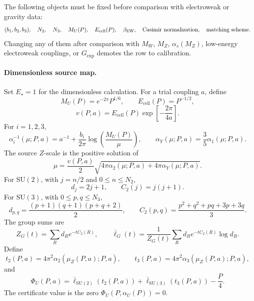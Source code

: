 \begin{definition}
The following objects must be fixed before comparison with electroweak or gravity data:
\[
(b_1,b_2,b_3),\quad
N_2,\quad
N_3,\quad
M_U(P),\quad
E_{\mathrm{cell}}(P),\quad
\beta_{\mathrm{EW}},\quad
\hbox{Casimir normalization},\quad
\hbox{matching scheme}.
\]
Changing any of them after comparison with \(M_W\), \(M_Z\), \(\alpha_s(M_Z)\), low-energy
electroweak couplings, or \(G_{\mathrm{exp}}\) demotes the row to calibration.
\end{definition}

\paragraph{Dimensionless source map.}
Set \(E_\star=1\) for the dimensionless calculation. For a trial coupling \(a\), define
\[
M_U(P)=e^{-2\pi}P^{1/6},
\qquad
E_{\mathrm{cell}}(P)=P^{-1/2},
\]
\[
v(P,a)=E_{\mathrm{cell}}(P)\exp\!\left[-\frac{2\pi}{4a}\right].
\]
For \(i=1,2,3\),
\[
\alpha_i^{-1}(\mu;P,a)
=
a^{-1}
+
\frac{b_i}{2\pi}\log\!\left(\frac{M_U(P)}{\mu}\right),
\qquad
\alpha_Y(\mu;P,a)=\frac35\alpha_1(\mu;P,a).
\]
The source \(Z\)-scale is the positive solution of
\[
\mu
=
\frac{v(P,a)}{2}
\sqrt{4\pi\alpha_2(\mu;P,a)+4\pi\alpha_Y(\mu;P,a)}.
\]
For \(\mathrm{SU}(2)\), with \(j=n/2\) and \(0\le n\le N_2\),
\[
d_j=2j+1,\qquad C_2(j)=j(j+1).
\]
For \(\mathrm{SU}(3)\), with \(0\le p,q\le N_3\),
\[
d_{p,q}=\frac{(p+1)(q+1)(p+q+2)}{2},
\qquad
C_2(p,q)=\frac{p^2+q^2+pq+3p+3q}{3}.
\]
The group sums are
\[
Z_G(t)=\sum_R d_R e^{-tC_2(R)},
\qquad
\bar\ell_G(t)=
\frac{1}{Z_G(t)}
\sum_R d_R e^{-tC_2(R)}\log d_R.
\]
Define
\[
t_2(P,a)=4\pi^2\alpha_2(\mu_Z(P,a);P,a),
\qquad
t_3(P,a)=4\pi^2\alpha_3(\mu_Z(P,a);P,a),
\]
and
\[
\Phi_U(P,a)
=
\bar\ell_{\mathrm{SU}(2)}(t_2(P,a))
+
\bar\ell_{\mathrm{SU}(3)}(t_3(P,a))
-
\frac{P}{4}.
\]
The certificate value is the zero \(\Phi_U(P,\alpha_U(P))=0\).

